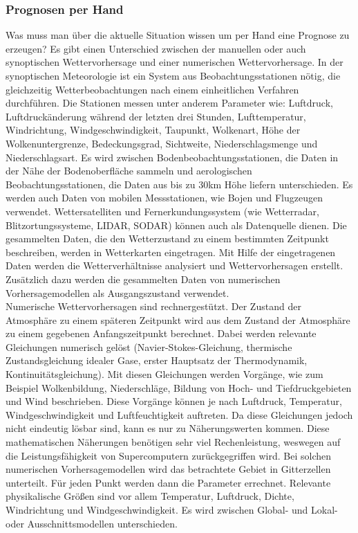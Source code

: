 \subsubsection{Prognosen per Hand} %
Was muss man über die aktuelle Situation wissen um per Hand eine Prognose zu erzeugen?
Es gibt einen Unterschied zwischen der manuellen oder auch synoptischen Wettervorhersage und einer numerischen Wettervorhersage.
In der synoptischen Meteorologie ist ein System aus Beobachtungsstationen nötig, die gleichzeitig Wetterbeobachtungen nach einem einheitlichen Verfahren durchführen.
Die Stationen messen unter anderem Parameter wie:
Luftdruck, Luftdruckänderung während der letzten drei Stunden, Lufttemperatur, Windrichtung, Windgeschwindigkeit, Taupunkt, Wolkenart, Höhe der Wolkenuntergrenze, Bedeckungsgrad, Sichtweite, Niederschlagsmenge und Niederschlagsart.
Es wird zwischen Bodenbeobachtungsstationen, die Daten in der Nähe der Bodenoberfläche sammeln und aerologischen Beobachtungsstationen, die Daten aus bis zu 30km Höhe liefern unterschieden.
Es werden auch Daten von mobilen Messstationen, wie Bojen und Flugzeugen verwendet.
Wettersatelliten und Fernerkundungssystem (wie Wetterradar, Blitzortungssysteme, LIDAR, SODAR) können auch als Datenquelle dienen.
Die gesammelten Daten, die den Wetterzustand zu einem bestimmten Zeitpunkt beschreiben, werden in Wetterkarten eingetragen.
Mit Hilfe der eingetragenen Daten werden die Wetterverhältnisse analysiert und Wettervorhersagen erstellt.
Zusätzlich dazu werden die gesammelten Daten von numerischen Vorhersagemodellen als Ausgangszustand verwendet. %
\\
Numerische Wettervorhersagen sind rechnergestützt.
Der Zustand der Atmosphäre zu einem späteren Zeitpunkt wird aus dem Zustand der Atmosphäre zu einem gegebenen Anfangszeitpunkt berechnet.
Dabei werden relevante Gleichungen numerisch gelöst
(Navier-Stokes-Gleichung, thermische Zustandsgleichung idealer Gase, erster Hauptsatz der Thermodynamik, Kontinuitätsgleichung).
Mit diesen Gleichungen werden Vorgänge, wie zum Beispiel Wolkenbildung, Niederschläge, Bildung von Hoch-  und Tiefdruckgebieten und Wind beschrieben.
Diese Vorgänge können je nach Luftdruck, Temperatur, Windgeschwindigkeit und Luftfeuchtigkeit auftreten.
Da diese Gleichungen jedoch nicht eindeutig lösbar sind, kann es nur zu Näherungswerten kommen.
Diese mathematischen Näherungen benötigen sehr viel Rechenleistung,
weswegen auf die Leistungsfähigkeit von Supercomputern zurückgegriffen wird.
Bei solchen numerischen Vorhersagemodellen wird das betrachtete Gebiet in Gitterzellen unterteilt.
Für jeden Punkt werden dann die Parameter errechnet.
Relevante physikalische Größen sind vor allem Temperatur, Luftdruck, Dichte, Windrichtung und Windgeschwindigkeit.
Es wird zwischen Global- und Lokal- oder Ausschnittsmodellen unterschieden.

